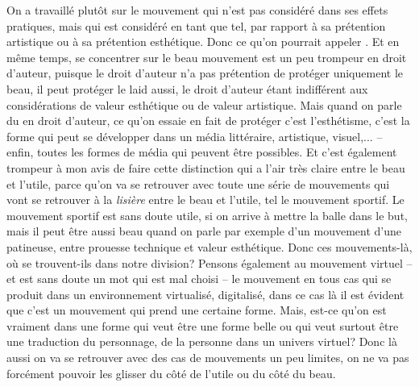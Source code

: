 {On a travaill\'e plut\^ot sur le mouvement qui n'est pas
consid\'er\'e dans ses effets pratiques, mais qui est consid\'er\'e en
tant que tel, par rapport \`a sa pr\'etention artistique ou \`a sa
pr\'etention esth\'etique. Donc ce qu'on pourrait appeler {\em {}}. Et en m\^eme temps, se concentrer sur le beau
mouvement est un peu trompeur en droit d'auteur, puisque le droit
d'auteur n'a pas pr\'etention de prot\'eger uniquement le beau, il peut
prot\'eger le laid aussi, le droit d'auteur \'etant indiff\'erent aux
consid\'erations de valeur esth\'etique ou de valeur artistique. Mais
quand on parle du  en droit d'auteur, ce qu'on essaie en fait de
prot\'eger c'est l'esth\'etisme, c'est la forme qui peut se
d\'evelopper dans un m\'edia litt\'eraire, artistique, visuel,... {--}
enfin, toutes les formes de m\'edia qui peuvent \^etre possibles. Et
c'est \'egalement trompeur \`a mon avis de faire cette distinction qui
a l'air tr\`es claire entre le beau et l'utile, parce qu'on va se
retrouver avec toute une s\'erie de mouvements qui vont se retrouver
\`a la {\em lisi\`ere} entre le beau et l'utile, tel le mouvement
sportif. Le mouvement sportif est sans doute utile, si on arrive \`a
mettre la balle dans le but, mais il peut \^etre aussi beau quand on
parle par exemple d'un mouvement d'une patineuse, entre prouesse
technique et valeur esth\'etique. Donc ces mouvements{}-l\`a, o\`u se
trouvent{}-ils dans notre division? Pensons \'egalement au mouvement
virtuel {--} et  est sans doute un mot qui est mal choisi
{--} le mouvement en tous cas qui se produit dans un environnement
virtualis\'e, digitalis\'e, dans ce cas l\`a il est \'evident que c'est
un mouvement qui prend une certaine forme. Mais, est{}-ce qu'on est
vraiment dans une forme qui veut \^etre une forme belle ou qui veut
surtout \^etre une traduction du personnage, de la personne dans un
univers virtuel? Donc l\`a aussi on va se retrouver avec des cas de
mouvements un peu limites, on ne va pas forc\'ement pouvoir les glisser
du c\^ot\'e de l'utile ou du c\^ot\'e du beau.\par

}
